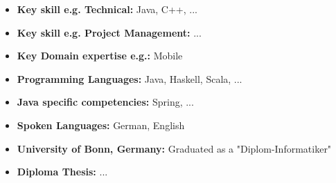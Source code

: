 \documentclass{rmprofile}
\begin{document}



\lipsum[1-2]

\begin{itemize}
   \item {\bf Key skill e.g. Technical:} Java, C++, ...
   \item {\bf Key skill e.g. Project Management:} ...
   \item {\bf Key Domain expertise e.g.:} Mobile
\end{itemize}

\pagebreak



\lipsum[3]


\lipsum[4]




\lipsum[5]


%
\begin{itemize}
   \item {\bf Programming Languages:} Java, Haskell, Scala, ...
   \item {\bf Java specific competencies:} Spring, ...
   \item {\bf Spoken Languages:} German, English
\end{itemize}

%
\begin{itemize}
   \item {\bf University of Bonn, Germany:} Graduated as a "Diplom-Informatiker"
\end{itemize}

%
\begin{itemize}
   \item {\bf Diploma Thesis:} ...
\end{itemize}
\end{document}

